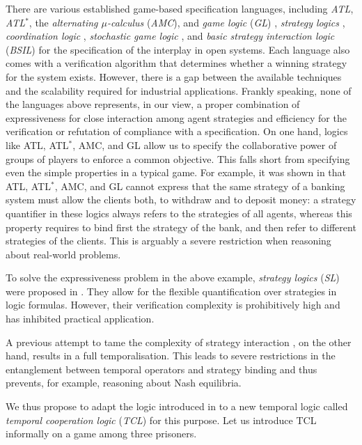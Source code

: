 \documentclass{llncs}
\begin{document}
There are various established game-based specification languages, 
including 
{\em ATL}, {\em ATL}$^*$, the {\em alternating $\mu$-calculus} ({\em AMC}), and 
{\em game logic} ({\em GL}) \cite{AHK02}, 
{\em strategy logics} \cite{CHP10,CLM10,MMV10,MMPV12}, 
{\em coordination logic} \cite{FS10},
{\em stochastic game logic} \cite{BBGK07}, and
{\em basic strategy interaction logic} ({\em BSIL}) \cite{WHY11}
for the specification of the interplay in open systems.  
Each language also comes with a verification algorithm that 
determines whether a winning strategy for the system exists.  
However, there is a gap between the available techniques and the scalability required for industrial applications.
Frankly speaking, none of the languages above represents, in our view, a proper combination of expressiveness for close interaction among agent strategies and efficiency for the verification or refutation of compliance with a specification.
On one hand, logics like ATL, ATL$^*$, AMC, and GL \cite{AHK02} allow 
us to specify the collaborative power of groups of players to enforce a common objective.
This falls short from specifying even the simple properties in 
a typical game.  
For example, it was shown in \cite{WHY11} 
that ATL, ATL$^*$, AMC, and GL \cite{AHK02}  
cannot express that the same strategy of a banking system must allow the clients 
both, to withdraw and to deposit money:
a strategy quantifier in these logics always refers to the strategies of all agents, whereas this property requires to bind first the strategy of the bank, and then refer to different strategies of the clients.
This is arguably a severe restriction when reasoning about real-world problems.  


To solve the expressiveness problem in the above example, 
{\em strategy logics} ({\em SL}) were proposed in \cite{BBGK07,CHP10,MMV10,MMPV12}. 
They allow for the flexible quantification over strategies in logic formulas.  
However, their verification complexity is prohibitively high 
and has inhibited practical application.  

A previous attempt to tame the complexity of strategy interaction \cite{WHY11}, on the other hand, results in a full temporalisation.
This leads to severe restrictions in the entanglement between temporal operators and strategy binding and thus prevents, for example, reasoning about Nash equilibria.

We thus propose to adapt the logic introduced in \cite{WHY11} to 
a new temporal logic called {\em temporal cooperation logic}
({\em TCL}) for this purpose.
%
Let us introduce TCL informally on a game among three prisoners.
\end{document}
